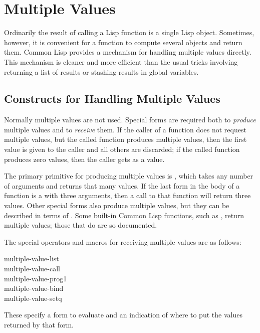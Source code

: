 \section{Multiple Values}

Ordinarily the result of calling a Lisp function is a single Lisp object.
Sometimes, however, it is convenient for a function to compute several
objects and return them.
Common Lisp provides a mechanism for handling multiple values directly.
This mechanism is cleaner and more efficient than the usual tricks
involving returning a list of results or stashing results in global
variables.

\subsection{Constructs for Handling Multiple Values}

Normally multiple values are not used.  Special forms are
required both to \emph{produce} multiple values and to \emph{receive} them.
If the caller of a function does not request multiple values,
but the called function produces multiple values, then the first
value is given to the caller and all others are discarded;
if the called function produces zero values, then the caller gets {\false}
as a value.

The primary primitive for producing multiple values is ,
which takes any number of arguments and returns that many values.  If the
last form in the body of a function is a  with three arguments,
then a call to that function will return three values.  Other special
forms also produce multiple values, but they can be described in terms of
.  Some built-in Common Lisp functions, such as , return
multiple values; those that do are so documented.

The special operators and macros for receiving multiple values are as follows:
\begin{lisp}
multiple-value-list \\
multiple-value-call \\
multiple-value-prog1 \\
multiple-value-bind \\
multiple-value-setq
\end{lisp}
These specify a form to evaluate and an indication of where to put
the values returned by that form.

